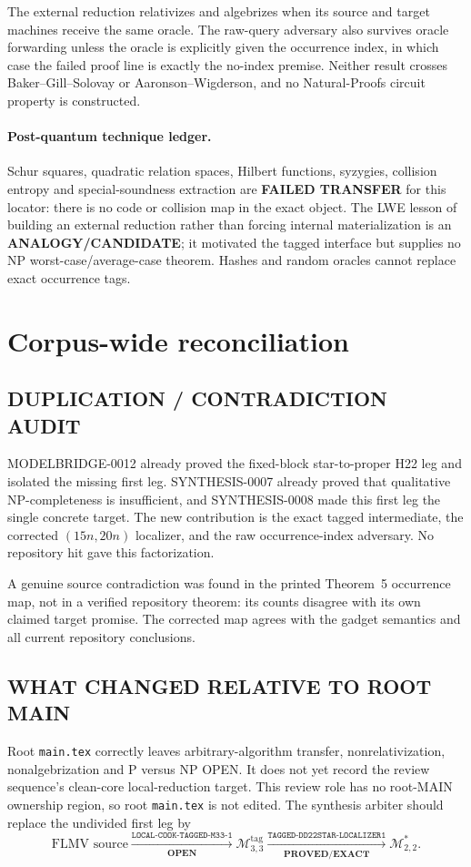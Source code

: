 \documentclass[11pt]{article}
\newcommand{\EXACT}{\textbf{PROVED/EXACT}}
\newcommand{\OPEN}{\textbf{OPEN}}
\newcommand{\Mthree}{\mathcal M_{3,3}^{\mathrm{tag}}}
\newcommand{\Mstar}{\mathcal M_{2,2}^{*}}
\begin{document}
The external reduction relativizes and algebrizes when its source and target
machines receive the same oracle.  The raw-query adversary also survives
oracle forwarding unless the oracle is explicitly given the occurrence
index, in which case the failed proof line is exactly the no-index premise.
Neither result crosses Baker--Gill--Solovay or Aaronson--Wigderson, and no
Natural-Proofs circuit property is constructed.

\paragraph{Post-quantum technique ledger.}
Schur squares, quadratic relation spaces, Hilbert functions, syzygies,
collision entropy and special-soundness extraction are \textbf{FAILED
TRANSFER} for this locator: there is no code or collision map in the exact
object.  The LWE lesson of building an external reduction rather than forcing
internal materialization is an \textbf{ANALOGY/CANDIDATE}; it motivated the
tagged interface but supplies no NP worst-case/average-case theorem.  Hashes
and random oracles cannot replace exact occurrence tags.

\section{Corpus-wide reconciliation}

\subsection*{DUPLICATION / CONTRADICTION AUDIT}
MODELBRIDGE-0012 already proved the fixed-block star-to-proper H22 leg and
isolated the missing first leg.  SYNTHESIS-0007 already proved that
qualitative NP-completeness is insufficient, and SYNTHESIS-0008 made this
first leg the single concrete target.  The new contribution is the exact
tagged intermediate, the corrected $(15n,20n)$ localizer, and the raw
occurrence-index adversary.  No repository hit gave this factorization.

A genuine source contradiction was found in the printed Theorem~5 occurrence
map, not in a verified repository theorem: its counts disagree with its own
claimed target promise.  The corrected map agrees with the gadget semantics
and all current repository conclusions.

\subsection*{WHAT CHANGED RELATIVE TO ROOT MAIN}
Root \texttt{main.tex} correctly leaves arbitrary-algorithm transfer,
nonrelativization, nonalgebrization and P versus NP OPEN.  It does not yet
record the review sequence's clean-core local-reduction target.  This review
role has no root-MAIN ownership region, so root \texttt{main.tex} is not
edited.  The synthesis arbiter should replace the undivided first leg by
\[
 \text{FLMV source}
 \xrightarrow[\OPEN]{\texttt{LOCAL-COOK-TAGGED-M33-1}}
 \Mthree
 \xrightarrow[\EXACT]{\texttt{TAGGED-DD22STAR-LOCALIZER1}}
 \Mstar.
\]
\end{document}
